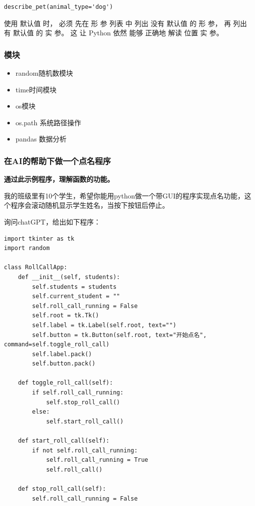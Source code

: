 \documentclass[10pt]{elegantnote}
\begin{document}
\begin{sloppypar}
\begin{lstlisting}
describe_pet(animal_type='dog')
\end{lstlisting}

使用 默认值 时， 必须 先在 形 参 列表 中 列出 没有 默认值 的 形 参， 再 列出 有 默认值 的 实 参。 这 让 Python 依然 能够 正确地 解读 位置 实 参。

    \subsubsection{模块}
    \begin{itemize}
      \item random随机数模块
      \item time时间模块
      \item os模块
      \item os.path 系统路径操作
      \item pandas 数据分析
    \end{itemize}

\subsubsection{在AI的帮助下做一个点名程序}

{\bfseries 通过此示例程序，理解函数的功能。}

\begin{framed}
    我的班级里有10个学生，希望你能用python做一个带GUI的程序实现点名功能，这个程序会滚动随机显示学生姓名，当按下按钮后停止。
\end{framed}

询问chatGPT，给出如下程序：

\begin{lstlisting}
import tkinter as tk
import random

class RollCallApp:
    def __init__(self, students):
        self.students = students
        self.current_student = ""
        self.roll_call_running = False
        self.root = tk.Tk()
        self.label = tk.Label(self.root, text="")
        self.button = tk.Button(self.root, text="开始点名", command=self.toggle_roll_call)
        self.label.pack()
        self.button.pack()

    def toggle_roll_call(self):
        if self.roll_call_running:
            self.stop_roll_call()
        else:
            self.start_roll_call()

    def start_roll_call(self):
        if not self.roll_call_running:
            self.roll_call_running = True
            self.roll_call()

    def stop_roll_call(self):
        self.roll_call_running = False


\end{lstlisting}
\end{sloppypar}
\end{document}
